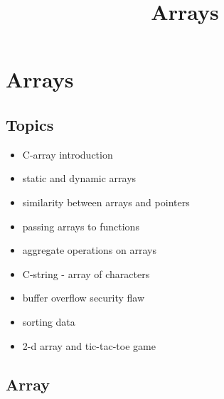 \documentclass[11pt]{article}
\title{Arrays}
\providecommand{\tightlist}{%
      \setlength{\itemsep}{0pt}\setlength{\parskip}{0pt}}
\begin{document}
    
    \maketitle
    
    

    
    \hypertarget{arrays}{%
\section{Arrays}\label{arrays}}

\hypertarget{topics}{%
\subsection{Topics}\label{topics}}

\begin{itemize}
\tightlist
\item
  C-array introduction
\item
  static and dynamic arrays
\item
  similarity between arrays and pointers
\item
  passing arrays to functions
\item
  aggregate operations on arrays
\item
  C-string - array of characters
\item
  buffer overflow security flaw
\item
  sorting data
\item
  2-d array and tic-tac-toe game
\end{itemize}

    \hypertarget{array}{%
\subsection{Array}\label{array}}
\end{document}
